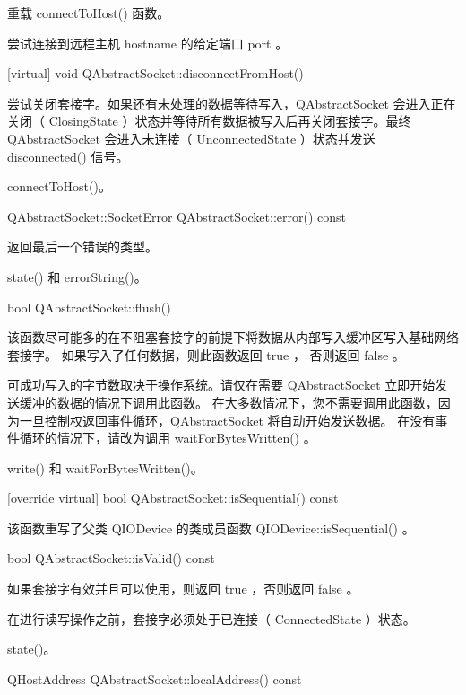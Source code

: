 重载 connectToHost() 函数。

尝试连接到远程主机 hostname 的给定端口 port 。

[virtual] void QAbstractSocket::disconnectFromHost()

尝试关闭套接字。如果还有未处理的数据等待写入，QAbstractSocket 会进入正在关闭（ ClosingState ）状态并等待所有数据被写入后再关闭套接字。最终 QAbstractSocket 会进入未连接（ UnconnectedState ）状态并发送 disconnected() 信号。


\begin{seeAlso}
connectToHost()。
\end{seeAlso}


QAbstractSocket::SocketError QAbstractSocket::error() const

返回最后一个错误的类型。


\begin{seeAlso}
 state() 和 errorString()。
\end{seeAlso}

bool QAbstractSocket::flush()

该函数尽可能多的在不阻塞套接字的前提下将数据从内部写入缓冲区写入基础网络套接字。 如果写入了任何数据，则此函数返回 true ， 否则返回 false 。

可成功写入的字节数取决于操作系统。请仅在需要 QAbstractSocket 立即开始发送缓冲的数据的情况下调用此函数。 在大多数情况下，您不需要调用此函数，因为一旦控制权返回事件循环，QAbstractSocket 将自动开始发送数据。 在没有事件循环的情况下，请改为调用 waitForBytesWritten() 。



\begin{seeAlso}
 write() 和 waitForBytesWritten()。
\end{seeAlso}

[override virtual] bool QAbstractSocket::isSequential() const

该函数重写了父类 QIODevice 的类成员函数 QIODevice::isSequential() 。

bool QAbstractSocket::isValid() const

如果套接字有效并且可以使用，则返回 true ，否则返回 false 。


\begin{notice}
在进行读写操作之前，套接字必须处于已连接（ ConnectedState ）状态。
\end{notice}


\begin{seeAlso}
 state()。
\end{seeAlso}


QHostAddress QAbstractSocket::localAddress() const

